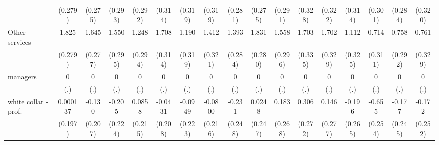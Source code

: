 {\begin{tabular}{l*{16}{c}}
                    &     (0.279)         &     (0.275)         &     (0.293)         &     (0.292)         &     (0.314)         &     (0.319)         &     (0.319)         &     (0.281)         &     (0.275)         &     (0.291)         &     (0.328)         &     (0.322)         &     (0.314)         &     (0.301)         &     (0.284)         &     (0.320)         \\
[1em]
Other services      &       1.825\sym{***}&       1.645\sym{***}&       1.550\sym{***}&       1.248\sym{***}&       1.708\sym{***}&       1.190\sym{***}&       1.412\sym{***}&       1.393\sym{***}&       1.831\sym{***}&       1.558\sym{***}&       1.703\sym{***}&       1.702\sym{***}&       1.112\sym{***}&       0.714\sym{*}  &       0.758\sym{**} &       0.761\sym{*}  \\
                    &     (0.279)         &     (0.277)         &     (0.295)         &     (0.294)         &     (0.314)         &     (0.319)         &     (0.321)         &     (0.284)         &     (0.280)         &     (0.296)         &     (0.335)         &     (0.329)         &     (0.325)         &     (0.311)         &     (0.292)         &     (0.329)         \\
[1em]
managers            &           0         &           0         &           0         &           0         &           0         &           0         &           0         &           0         &           0         &           0         &           0         &           0         &           0         &           0         &           0         &           0         \\
                    &         (.)         &         (.)         &         (.)         &         (.)         &         (.)         &         (.)         &         (.)         &         (.)         &         (.)         &         (.)         &         (.)         &         (.)         &         (.)         &         (.)         &         (.)         &         (.)         \\
[1em]
white collar - prof.&    0.000137         &      -0.130         &      -0.205         &      0.0858         &     -0.0431         &     -0.0949         &     -0.0800         &      -0.231         &      0.0248         &       0.183         &       0.306         &       0.146         &      -0.196         &      -0.655\sym{**} &      -0.177         &      -0.172         \\
                    &     (0.197)         &     (0.207)         &     (0.224)         &     (0.215)         &     (0.208)         &     (0.223)         &     (0.216)         &     (0.248)         &     (0.247)         &     (0.268)         &     (0.272)         &     (0.277)         &     (0.265)         &     (0.254)         &     (0.245)         &     (0.252)         \\

\end{tabular}}
